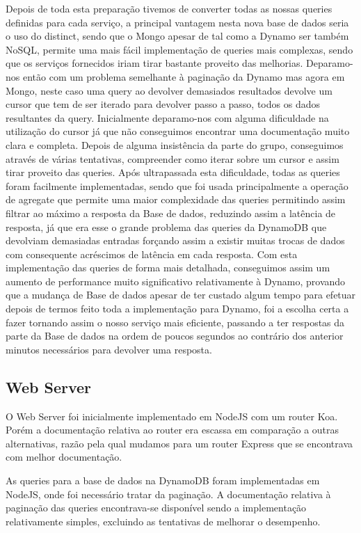 \documentclass[11pt,a4paper]{article}
\begin{document}
Depois de toda esta preparação tivemos de converter todas as nossas queries definidas para cada serviço, a principal vantagem nesta nova base de dados seria o uso do distinct, sendo que o Mongo apesar de tal como a Dynamo  ser também NoSQL, permite uma mais fácil implementação de queries mais complexas, sendo que os serviços fornecidos iriam tirar bastante proveito das melhorias. Deparamo-nos então com um problema semelhante à paginação da Dynamo mas agora em Mongo, neste caso uma query ao devolver demasiados resultados devolve um cursor que tem de ser iterado para devolver passo a passo, todos os dados resultantes da query. Inicialmente deparamo-nos com alguma dificuldade na utilização do cursor já que não conseguimos encontrar uma documentação muito clara e completa. Depois de alguma insistência da parte do grupo, conseguimos através de várias tentativas, compreender como iterar sobre um cursor e assim tirar proveito das queries. Após ultrapassada esta dificuldade, todas as queries foram facilmente implementadas, sendo que foi usada principalmente a operação de agregate que permite uma maior complexidade das queries permitindo assim filtrar ao máximo a resposta da Base de dados, reduzindo assim a latência de resposta, já que era esse o grande problema das queries da DynamoDB que devolviam demasiadas entradas forçando assim a existir muitas trocas de dados com consequente acréscimos de latência em cada resposta.
Com esta implementação das queries de forma mais detalhada, conseguimos assim um aumento de performance muito significativo relativamente à Dynamo, provando que a mudança de Base de dados apesar de ter custado algum tempo para efetuar depois de termos feito toda a implementação para Dynamo, foi a escolha certa a fazer tornando assim o nosso serviço mais eficiente, passando a ter respostas da parte da Base de dados na ordem de poucos segundos ao contrário dos anterior minutos necessários para devolver uma resposta.

\subsection{Web Server}
O Web Server foi inicialmente implementado em NodeJS com um router Koa. Porém a documentação relativa ao router era escassa em comparação a outras alternativas, razão pela qual mudamos para um router Express que se encontrava com melhor documentação.

As queries para a base de dados na DynamoDB foram implementadas em NodeJS, onde foi necessário tratar da paginação. A documentação relativa à paginação das queries encontrava-se disponível sendo a implementação relativamente simples, excluindo as tentativas de melhorar o desempenho.
\end{document}
